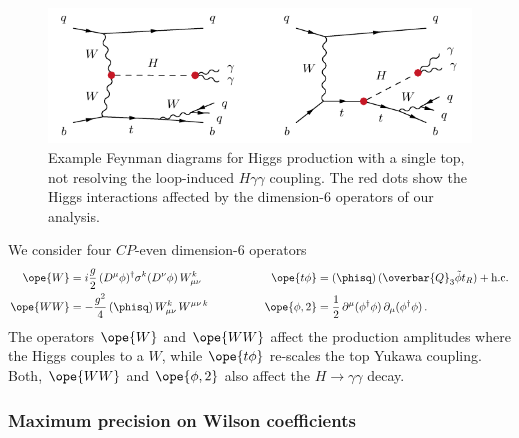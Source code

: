 \begin{figure}
  \includegraphics[width=0.773 \textwidth]{fig/information/th_diag.pdf}%
  \caption{Example Feynman diagrams for Higgs production with a single
    top, not resolving the loop-induced $H\gamma \gamma$ coupling. The red
    dots show the Higgs interactions affected by the dimension-6
    operators of our analysis.}
\label{fig:information_th_diag}
\end{figure}

We consider four $CP$-even dimension-6 operators
%
\begin{alignat}{2}
  \ope{W}  &= i \frac{g}{2} \, (D^\mu\phi)^\dagger \sigma^k ( D^\nu\phi) \, W_{\mu\nu}^k  \qquad & \qquad
  \ope{t \phi}  &= (\phisq) \, ( \overbar{Q}_3 \tilde{\phi} t_R)  + \text{h.c.} \notag \\
  \ope{WW}  &= -\frac{g^2}{4} \, (\phisq) \, W^k_{\mu\nu} \, W^{\mu\nu\, k}  \qquad & \qquad
  \ope{\phi,2}  &= \frac{1}{2} \, \partial^\mu(\phi^\dagger\phi) \, \partial_\mu(\phi^\dagger\phi) \,.
\label{eq:th_ope}
\end{alignat}
%
The operators $\ope{W}$ and $\ope{WW}$ affect the production amplitudes where
the Higgs couples to a $W$, while $\ope{t \phi}$ re-scales the top
Yukawa coupling. Both, $\ope{WW}$ and $\ope{\phi,2}$ also affect the
$H \to \gamma \gamma$ decay.


\subsubsection*{Maximum precision on Wilson coefficients}

